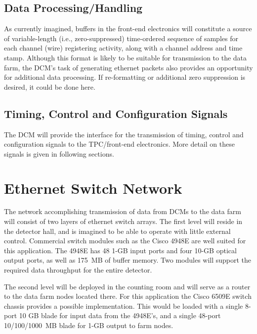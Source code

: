\subsection{Data Processing/Handling}

As currently imagined, buffers in the front-end electronics will constitute  
a source of variable-length (i.e., zero-suppressed) time-ordered sequence 
of samples for each channel (wire) registering activity, along with a 
channel address and time stamp.  Although this format is likely to be 
suitable for transmission to the data farm, the DCM's task of generating 
ethernet packets also provides an opportunity for additional data processing.  
If re-formatting or additional zero suppression is desired, 
it could be done here.   

\subsection{Timing, Control and Configuration Signals}

The DCM will provide the interface for the transmission of 
timing, control and configuration signals to the TPC/front-end electronics.
More detail on these signals is given in following sections.

\section{Ethernet Switch Network}
\label{sec:v5-trig-switch}

The network accomplishing transmission of data from DCMs to the data 
farm will consist of two layers of ethernet switch arrays.  
The first level will reside in the detector hall, and is imagined to be 
able to operate with little external control.  Commercial switch modules 
such as the Cisco 4948E are well suited for this application.  The 4948E 
has 48 1-GB input ports and four 10-GB optical output ports, 
as well as 175~MB of buffer memory.  Two modules will support the 
required data throughput for the entire detector.

The second level will be deployed in the counting room and will 
serve as a router to the data farm nodes located there.  For this application 
the Cisco 6509E switch chassis provides a possible implementation.  This 
would be loaded with a single 8-port 10 GB blade for input data from the 
4948E's, and a single 48-port 10/100/1000~MB blade for 1-GB output to 
farm nodes.

